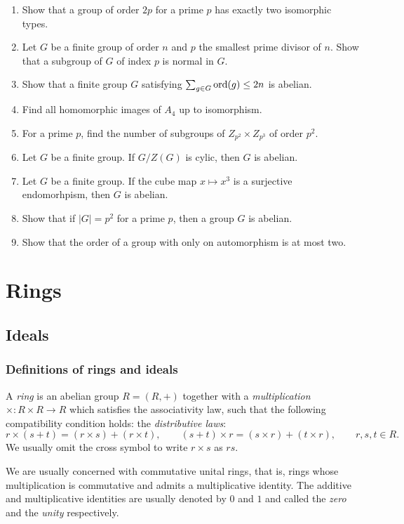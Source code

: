 \documentclass{../../large}
\begin{document}
\begin{enumerate}
\item Show that a group of order $2p$ for a prime $p$ has exactly two isomorphic types.
\item Let $G$ be a finite group of order $n$ and $p$ the smallest prime divisor of $n$. Show that a subgroup of $G$ of index $p$ is normal in $G$.
\item Show that a finite group $G$ satisfying $\sum_{g\in G}\operatorname{ord}(g)\le2n$ is abelian.
\item Find all homomorphic images of $A_4$ up to isomorphism.
\item For a prime $p$, find the number of subgroups of $Z_{p^2}\times Z_{p^3}$ of order $p^2$.
\item Let $G$ be a finite group. If $G/Z(G)$ is cylic, then $G$ is abelian.
\item Let $G$ be a finite group. If the cube map $x\mapsto x^3$ is a surjective endomorhpism, then $G$ is abelian.
\item Show that if $|G|=p^2$ for a prime $p$, then a group $G$ is abelian.
\item Show that the order of a group with only on automorphism is at most two.
\end{enumerate}










\part{Rings}
\chapter{Ideals}
\section{Definitions of rings and ideals}
\begin{prb}
A \emph{ring} is an abelian group $R=(R,+)$ together with a \emph{multiplication} $\times:R\times R\to R$ which satisfies the associativity law, such that the following compatibility condition holds: the \emph{distributive laws}:
\[r\times(s+t)=(r\times s)+(r\times t),\qquad(s+t)\times r=(s\times r)+(t\times r),\qquad r,s,t\in R.\]
We usually omit the cross symbol to write $r\times s$ as $rs$.

We are usually concerned with commutative unital rings, that is, rings whose multiplication is commutative and admits a multiplicative identity.
The additive and multiplicative identities are usually denoted by $0$ and $1$ and called the \emph{zero} and the \emph{unity} respectively.
\end{prb}
\end{document}
